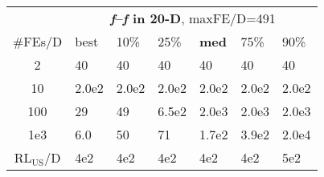 \begin{tabular}{c|llllll}
 & \multicolumn{6}{|c}{\textbf{\textit{f}\raisebox{-0.35ex}{1}--\textit{f}\raisebox{-0.35ex}{24} in 20-D}, maxFE/D=491}\\
\#FEs/D & best & 10\% & 25\% & \textbf{med} & 75\% & 90\%\\
2 & 40 & 40 & 40 & 40 & 40 & 40\\
10 & 2.0e2 & 2.0e2 & 2.0e2 & 2.0e2 & 2.0e2 & 2.0e2\\
100 & 29 & 49 & 6.5e2 & 2.0e3 & 2.0e3 & 2.0e3\\
1e3 & \hspace*{1ex}6.0 & 50 & 71 & 1.7e2 & 3.9e2 & 2.0e4\\
$\text{RL}_{\text{US}}$/D & 4e2 & 4e2 & 4e2 & 4e2 & 4e2 & 5e2
\end{tabular}
